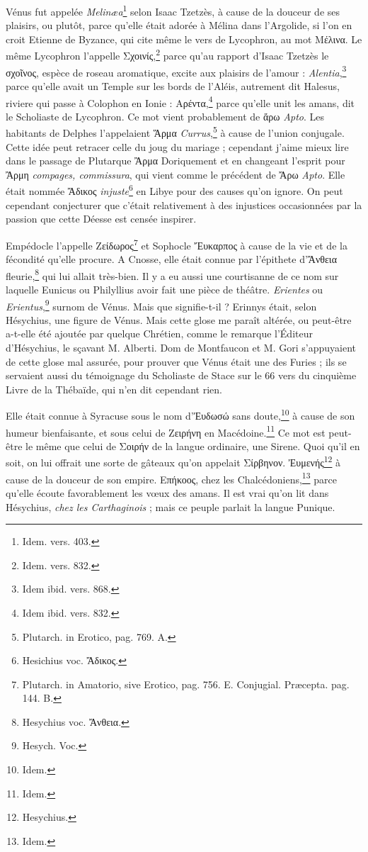 \documentclass[a4paper, 18pt, oneside]{article}
\begin{document}
Vénus fut appelée \emph{Melinæa}\footnote{Idem. vers. 403.} selon Isaac Tzetzès, à cause de la douceur de ses plaisirs, ou plutôt, parce qu'elle était adorée à Mélina dans l'Argolide, si l'on en croit Etienne de Byzance, qui cite même le vers de Lycophron, au mot Μέλινα. Le même Lycophron l'appelle Σχοινίς,\footnote{Idem. vers. 832.} parce qu'au rapport d'Isaac Tzetzès le σχοῖνος, espèce de roseau aromatique, excite aux plaisirs de l'amour : \emph{Alentia},\footnote{Idem ibid. vers. 868.} parce qu'elle avait un Temple sur les bords de l'Aléis, autrement dit Halesus, riviere qui passe à Colophon en Ionie : Αρέντα,\footnote{Idem ibid. vers. 832.} parce qu'elle unit les amans, dit le Scholiaste de Lycophron. Ce mot vient probablement de ἄρω \emph{Apto}. Les habitants de Delphes l'appelaient Ἅρμα \emph{Currus},\footnote{Plutarch. in Erotico, pag. 769. A.} à cause de l'union conjugale. Cette idée peut retracer celle du joug du mariage ; cependant j'aime mieux lire dans le passage de Plutarque Ἂρμα Doriquement et en changeant l'esprit pour Ἂρμη \emph{compages, commissura}, qui vient comme le précédent de Ἄρω \emph{Apto}. Elle était nommée Ἄδικος \emph{injuste}\footnote{Hesichius voc. Ἄδικος.} en Libye pour des causes qu'on ignore. On peut cependant conjecturer que c'était relativement à des injustices occasionnées par la passion que cette Déesse est censée inspirer.

Empédocle l'appelle Ζείδωρος\footnote{Plutarch. in Amatorio, sive Erotico, pag. 756. E. Conjugial. Præcepta. pag. 144. B.} et Sophocle Ἔυκαρπος à cause de la vie et de la fécondité qu'elle procure. A Cnosse, elle était connue par l'épithete d'Ἄνθεια fleurie,\footnote{Hesychius voc. Ἄνθεια.} qui lui allait très-bien. Il y a eu aussi une courtisanne de ce nom sur laquelle Eunicus ou Philyllius avoir fait une pièce de théâtre. \emph{Erientes} ou \emph{Erientus},\footnote{Hesych. Voc.} surnom de Vénus. Mais que signifie-t-il ? Erinnys était, selon Hésychius, une figure de Vénus. Mais cette glose me paraît altérée, ou peut-être a-t-elle été ajoutée par quelque Chrétien, comme le remarque l'Éditeur d'Hésychius, le sçavant M. Alberti. Dom de Montfaucon et M. Gori s'appuyaient de cette glose mal assurée, pour prouver que Vénus était une des Furies ; ils se servaient aussi du témoignage du Scholiaste de Stace sur le 66 vers du cinquième Livre de la Thébaïde, qui n'en dit cependant rien.

Elle était connue à Syracuse sous le nom d'Ἐυδωσώ sans doute,\footnote{Idem.} à cause de son humeur bienfaisante, et sous celui de Ζειρήνη en Macédoine.\footnote{Idem.} Ce mot est peut-être le même que celui de Σοιρήν de la langue ordinaire, une Sirene. Quoi qu'il en soit, on lui offrait une sorte de gâteaux qu'on appelait Σίρβηνον. Ἐυμενής\footnote{Hesychius.} à cause de la douceur de son empire. Επήκοος, chez les Chalcédoniens,\footnote{Idem.} parce qu'elle écoute favorablement les vœux des amans. Il est vrai qu'on lit dans Hésychius, \emph{chez les Carthaginois} ; mais ce peuple parlait la langue Punique.
\end{document}
